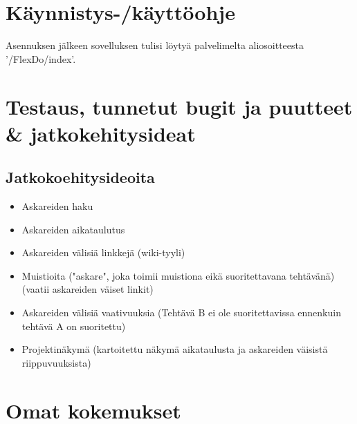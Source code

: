 ﻿\documentclass[finnish]{article}
\begin{document}
\section{Käynnistys-/käyttöohje}

Asennuksen jälkeen sovelluksen tulisi löytyä palvelimelta aliosoitteesta '/FlexDo/index'.


\section{Testaus, tunnetut bugit ja puutteet \& jatkokehitysideat}

\subsection{Jatkokoehitysideoita}

\begin{itemize}
  \item Askareiden haku
  \item Askareiden aikataulutus
  \item Askareiden välisiä linkkejä (wiki-tyyli)
  \item Muistioita ("askare", joka toimii muistiona eikä suoritettavana tehtävänä) (vaatii askareiden väiset linkit)
  \item Askareiden välisiä vaativuuksia (Tehtävä B ei ole suoritettavissa ennenkuin tehtävä A on suoritettu)
  \item Projektinäkymä (kartoitettu näkymä aikataulusta ja askareiden väisistä riippuvuuksista)
\end{itemize}


\section{Omat kokemukset}
\end{document}
